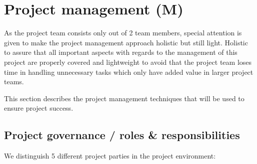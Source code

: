 \section{Project management (M)}
\label{sec:project-management}
As the project team consists only out of 2 team members, special attention is given to make the project management approach holistic but still light.
Holistic to assure that all important aspects with regards to the management of this project are properly covered and lightweight to avoid that the project team loses time in handling unnecessary tasks which only have added value in larger project teams. 

This section describes the project management techniques that will be used to ensure project success.
\subsection{Project governance / roles \& responsibilities}
We distinguish 5 different project parties in the project environment:
